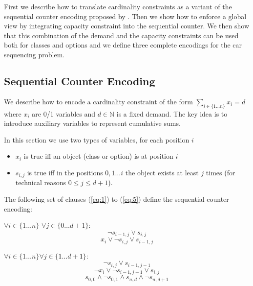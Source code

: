 \documentclass[]{easychair}
\begin{document}
First we describe how to translate cardinality constraints as a variant of the sequential counter encoding proposed by
\cite{Sinz05}. Then we show how to enforce a global view by integrating capacity constraint into the sequential counter.
We then show that this combination of the demand and the capacity constraints can be used both for classes and options
and we define three complete encodings for the car sequencing problem. 

\subsection{Sequential Counter Encoding}
\label{sub:card}

We describe how to encode a cardinality constraint of the form $ \sum_{i\in \{1\ldots n\}} x_{i} = d $ where $x_i$ are
0/1 variables and $d\in \mathbb{N}$ is a fixed demand. The key idea is to introduce auxiliary variables to represent
cumulative sums.

In this section we use two types of variables, for each position $i$

\begin{itemize}
    \item  $x_i$ is true iff an object (class or option) is at position $i$
    \item  $s_{i,j}$ is true iff in the positions $0,1 \ldots i$ the object exists at least $j$ times (for technical
        reasons $0 \leq j \leq d+1$). 
\end{itemize} 

The following set of clauses (\ref{eq:1}) to (\ref{eq:5}) define the sequential counter encoding:

$\forall i \in \{1\ldots n\}$ $\forall j \in\{0 \ldots d+1\}$: 
\begin{equation} \label{eq:1}
    \neg s_{i-1,j} \vee s_{i,j}
\end{equation}
\begin{equation} \label{eq:2}
    x_{i} \vee \neg s_{i,j} \vee s_{i-1,j}
\end{equation}

$\forall {i \in \{1\ldots n\}} \forall {j\in \{1\ldots d+1\}}$: 
\begin{equation} \label{eq:3}
    \neg s_{i,j} \vee s_{i-1,j-1}
\end{equation}
\begin{equation} \label{eq:4}
    \neg x_{i} \vee \neg s_{i-1,j-1} \vee s_{i,j}
\end{equation}
\begin{equation} \label{eq:5}
     s_{0,0} \wedge \neg s_{0,1} \wedge s_{n,d} \wedge \neg s_{n,d+1}
\end{equation}
\end{document}
